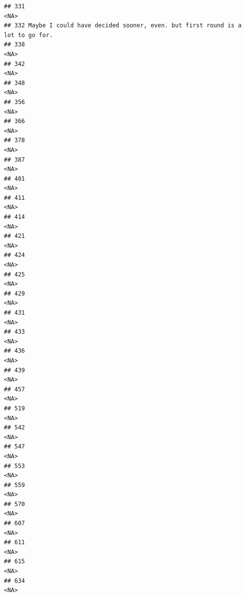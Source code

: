 \documentclass[
]{article}
\begin{document}
\begin{verbatim}
## 331                                                                         <NA>
## 332 Maybe I could have decided sooner, even. but first round is a lot to go for.
## 338                                                                         <NA>
## 342                                                                         <NA>
## 348                                                                         <NA>
## 356                                                                         <NA>
## 366                                                                         <NA>
## 378                                                                         <NA>
## 387                                                                         <NA>
## 401                                                                         <NA>
## 411                                                                         <NA>
## 414                                                                         <NA>
## 421                                                                         <NA>
## 424                                                                         <NA>
## 425                                                                         <NA>
## 429                                                                         <NA>
## 431                                                                         <NA>
## 433                                                                         <NA>
## 436                                                                         <NA>
## 439                                                                         <NA>
## 457                                                                         <NA>
## 519                                                                         <NA>
## 542                                                                         <NA>
## 547                                                                         <NA>
## 553                                                                         <NA>
## 559                                                                         <NA>
## 570                                                                         <NA>
## 607                                                                         <NA>
## 611                                                                         <NA>
## 615                                                                         <NA>
## 634                                                                         <NA>

\end{verbatim}
\end{document}

